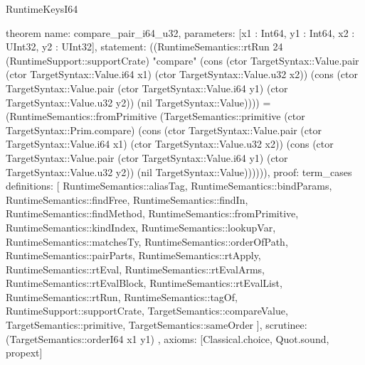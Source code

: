 \begin{lexlean}{RuntimeKeysI64}
\begin{semanticmodule}
theorem{
  name: compare_pair_i64_u32,
  parameters: [x1 : Int64, y1 : Int64, x2 : UInt32, y2 : UInt32],
  statement: ((RuntimeSemantics::rtRun 24 (RuntimeSupport::supportCrate) "compare" (cons (ctor TargetSyntax::Value.pair (ctor TargetSyntax::Value.i64 x1) (ctor TargetSyntax::Value.u32 x2)) (cons (ctor TargetSyntax::Value.pair (ctor TargetSyntax::Value.i64 y1) (ctor TargetSyntax::Value.u32 y2)) (nil TargetSyntax::Value)))) = (RuntimeSemantics::fromPrimitive (TargetSemantics::primitive (ctor TargetSyntax::Prim.compare) (cons (ctor TargetSyntax::Value.pair (ctor TargetSyntax::Value.i64 x1) (ctor TargetSyntax::Value.u32 x2)) (cons (ctor TargetSyntax::Value.pair (ctor TargetSyntax::Value.i64 y1) (ctor TargetSyntax::Value.u32 y2)) (nil TargetSyntax::Value)))))),
  proof: term_cases{
    definitions: [
      RuntimeSemantics::aliasTag,
      RuntimeSemantics::bindParams,
      RuntimeSemantics::findFree,
      RuntimeSemantics::findIn,
      RuntimeSemantics::findMethod,
      RuntimeSemantics::fromPrimitive,
      RuntimeSemantics::kindIndex,
      RuntimeSemantics::lookupVar,
      RuntimeSemantics::matchesTy,
      RuntimeSemantics::orderOfPath,
      RuntimeSemantics::pairParts,
      RuntimeSemantics::rtApply,
      RuntimeSemantics::rtEval,
      RuntimeSemantics::rtEvalArms,
      RuntimeSemantics::rtEvalBlock,
      RuntimeSemantics::rtEvalList,
      RuntimeSemantics::rtRun,
      RuntimeSemantics::tagOf,
      RuntimeSupport::supportCrate,
      TargetSemantics::compareValue,
      TargetSemantics::primitive,
      TargetSemantics::sameOrder
    ],
    scrutinee: (TargetSemantics::orderI64 x1 y1)
  },
  axioms: [Classical.choice, Quot.sound, propext]
}


\end{semanticmodule}
\end{lexlean}

